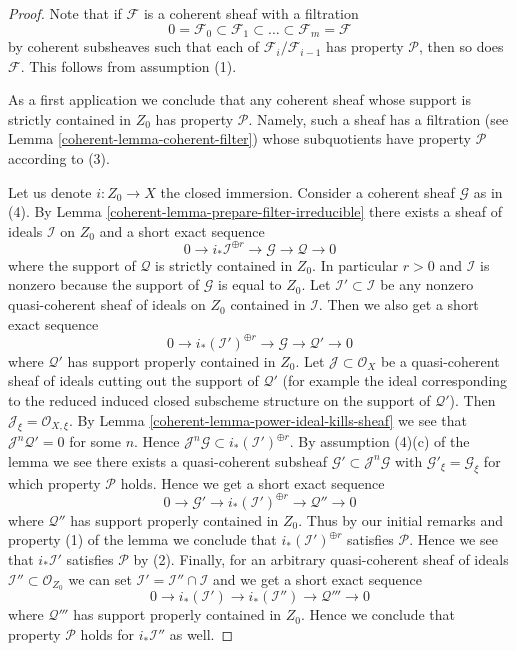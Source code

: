 \begin{proof}

Note that if $\mathcal{F}$ is a coherent sheaf with a filtration
$$
0 = \mathcal{F}_0 \subset \mathcal{F}_1 \subset
\ldots \subset \mathcal{F}_m = \mathcal{F}
$$
by coherent subsheaves such that each of $\mathcal{F}_i/\mathcal{F}_{i - 1}$
has property $\mathcal{P}$, then so does $\mathcal{F}$.
This follows from assumption (1).

\medskip\noindent
As a first application we conclude that any coherent sheaf whose support
is strictly contained in $Z_0$ has property $\mathcal{P}$. Namely, such a
sheaf has a filtration (see Lemma \ref{coherent-lemma-coherent-filter})
whose subquotients have property $\mathcal{P}$ according to (3).

\medskip\noindent
Let us denote $i : Z_0 \to X$ the closed immersion.
Consider a coherent sheaf $\mathcal{G}$ as in (4).
By Lemma \ref{coherent-lemma-prepare-filter-irreducible}
there exists a sheaf of ideals $\mathcal{I}$ on $Z_0$ and
a short exact sequence
$$
0 \to
i_*\mathcal{I}^{\oplus r} \to
\mathcal{G} \to
\mathcal{Q} \to 0
$$
where the support of $\mathcal{Q}$ is strictly contained in $Z_0$.
In particular $r > 0$ and $\mathcal{I}$ is nonzero
because the support of $\mathcal{G}$ is equal to $Z_0$.
Let $\mathcal{I}' \subset \mathcal{I}$ be any nonzero quasi-coherent
sheaf of ideals on $Z_0$ contained in $\mathcal{I}$.
Then we also get a short exact sequence
$$
0 \to
i_*(\mathcal{I}')^{\oplus r} \to
\mathcal{G} \to
\mathcal{Q}' \to 0
$$
where $\mathcal{Q}'$ has support properly contained in $Z_0$.
Let $\mathcal{J} \subset \mathcal{O}_X$ be a quasi-coherent sheaf
of ideals cutting out the support of $\mathcal{Q}'$ (for example
the ideal corresponding to the reduced induced closed subscheme
structure on the support of $\mathcal{Q}'$). Then
$\mathcal{J}_\xi = \mathcal{O}_{X, \xi}$. By
Lemma \ref{coherent-lemma-power-ideal-kills-sheaf}
we see that $\mathcal{J}^n\mathcal{Q}' = 0$ for some $n$.
Hence $\mathcal{J}^n\mathcal{G} \subset i_*(\mathcal{I}')^{\oplus r}$.
By assumption (4)(c) of the lemma we see there exists
a quasi-coherent subsheaf $\mathcal{G}' \subset \mathcal{J}^n\mathcal{G}$
with $\mathcal{G}'_\xi = \mathcal{G}_\xi$
for which property $\mathcal{P}$ holds.
Hence we get a short exact sequence
$$
0 \to \mathcal{G}' \to
i_*(\mathcal{I}')^{\oplus r} \to
\mathcal{Q}'' \to 0
$$
where $\mathcal{Q}''$ has support properly contained in $Z_0$.
Thus by our initial remarks and property (1) of the lemma
we conclude that $i_*(\mathcal{I}')^{\oplus r}$ satisfies
$\mathcal{P}$. Hence we see that $i_*\mathcal{I}'$ satisfies
$\mathcal{P}$ by (2). Finally, for an arbitrary quasi-coherent
sheaf of ideals $\mathcal{I}'' \subset \mathcal{O}_{Z_0}$ we can set
$\mathcal{I}' = \mathcal{I}'' \cap \mathcal{I}$ and we get
a short exact sequence
$$
0 \to
i_*(\mathcal{I}') \to
i_*(\mathcal{I}'') \to
\mathcal{Q}''' \to 0
$$
where $\mathcal{Q}'''$ has support properly contained in $Z_0$.
Hence we conclude that property $\mathcal{P}$ holds for
$i_*\mathcal{I}''$ as well.


\end{proof}
